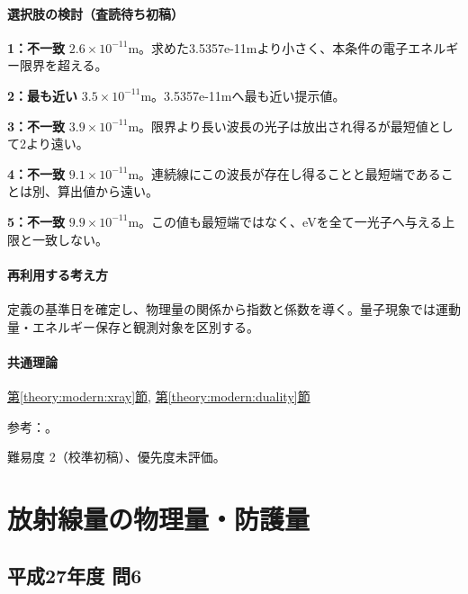 \paragraph{選択肢の検討（査読待ち初稿）}\mbox{}\par

\noindent\textbf{1：不一致} \(2.6\times10^{-11}\mathrm m\)。求めた3.5357e-11mより小さく、本条件の電子エネルギー限界を超える。\par

\noindent\textbf{2：最も近い} \(3.5\times10^{-11}\mathrm m\)。3.5357e-11mへ最も近い提示値。\par

\noindent\textbf{3：不一致} \(3.9\times10^{-11}\mathrm m\)。限界より長い波長の光子は放出され得るが最短値として2より遠い。\par

\noindent\textbf{4：不一致} \(9.1\times10^{-11}\mathrm m\)。連続線にこの波長が存在し得ることと最短端であることは別、算出値から遠い。\par

\noindent\textbf{5：不一致} \(9.9\times10^{-11}\mathrm m\)。この値も最短端ではなく、eVを全て一光子へ与える上限と一致しない。\par

\paragraph{再利用する考え方} 定義の基準日を確定し、物理量の関係から指数と係数を導く。量子現象では運動量・エネルギー保存と観測対象を区別する。

\paragraph{共通理論} \hyperref[theory:modern:xray]{第\ref*{theory:modern:xray}節}, \hyperref[theory:modern:duality]{第\ref*{theory:modern:duality}節}

\par 参考：\cite{os_photoelectric}。

\par 難易度 2（校準初稿）、優先度未評価。

\section{放射線量の物理量・防護量}

\subsection{平成27年度 問6}
\label{q:h27-reg-applied-06}

